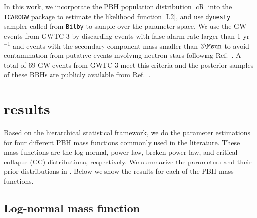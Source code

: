 \documentclass[
reprint,           %
superscriptaddress,%
amsmath,           %
amssymb,           %
aps,               %
prd,               %
notitlepage,       %
longbibliography,  %
floatfix,          %
nofootinbib,
]{revtex4-1}
\begin{document}
In this work, we incorporate the PBH population distribution \eqref{cR} into the \texttt{ICAROGW} \cite{Mastrogiovanni:2021wsd} package to estimate the likelihood function \eqref{L2}, and use \texttt{dynesty} \cite{Speagle:2019ivv} sampler called from \texttt{Bilby} \cite{Ashton:2018jfp,Romero-Shaw:2020owr} to sample over the parameter space. We use the GW events from GWTC-3 by discarding events with false alarm rate larger than 1 yr$^{-1}$ and events with the secondary component mass smaller than $3\Msun$ to avoid contamination from putative events involving neutron stars following Ref.~\cite{DeLuca:2021wjr}. A total of $69$ GW events from GWTC-3 meet this criteria and the posterior samples of these BBHs are publicly available from Ref.~\cite{ligo_scientific_collaboration_and_virgo_2021_5655785}.

\section{\label{result}results}

Based on the hierarchical statistical framework, we do the parameter estimations for four different PBH mass functions commonly used in the literature. These mass functions are the log-normal, power-law, broken power-law, and critical collapse (CC) distributions, respectively. We summarize the parameters and their prior distributions in . Below we show the results for each of the PBH mass functions.

\subsection{Log-normal mass function}
\end{document}
